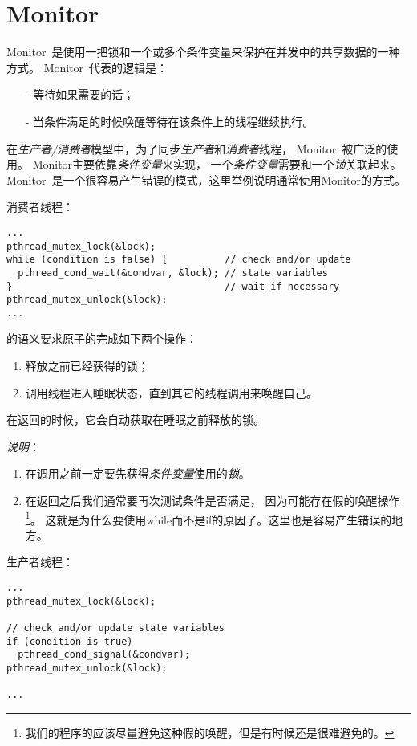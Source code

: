 \section{Monitor}
Monitor~是使用一把锁和一个或多个条件变量来保护在并发中的共享数据的一种方式。
Monitor~代表的逻辑是：
\begin{itemize}
\item[-] 等待如果需要的话；
\item[-] 当条件满足的时候唤醒等待在该条件上的线程继续执行。
\end{itemize}

在\emph{生产者/消费者}模型中，为了同步\emph{生产者}和\emph{消费者}线程，
Monitor~被广泛的使用。 
Monitor主要依靠\emph{条件变量}来实现，
一个\emph{条件变量}需要和一个\emph{锁}关联起来。
Monitor~是一个很容易产生错误的模式，这里举例说明通常使用Monitor的方式。

消费者线程：
\begin{lstlisting}
...
pthread_mutex_lock(&lock);
while (condition is false) {          // check and/or update 
  pthread_cond_wait(&condvar, &lock); // state variables
}                                     // wait if necessary
pthread_mutex_unlock(&lock);
...
\end{lstlisting}
的语义要求原子的完成如下两个操作：
\begin{enumerate}
\item 释放之前已经获得的锁；
\item 调用线程进入睡眠状态，直到其它的线程调用来唤醒自己。
\end{enumerate}
在返回的时候，它会自动获取在睡眠之前释放的锁。

\emph{说明}：
\begin{enumerate}
\item 在调用之前一定要先获得\emph{条件变量}使用的\emph{锁}。
\item 在返回之后我们通常要再次测试条件是否满足，
因为可能存在假的唤醒操作\footnote{我们的程序的应该尽量避免这种假的唤醒，但是有时候还是很难避免的。}。
这就是为什么要使用while而不是if的原因了。这里也是容易产生错误的地方。
\end{enumerate}

生产者线程：
\begin{lstlisting}
...
pthread_mutex_lock(&lock);

// check and/or update state variables
if (condition is true)
  pthread_cond_signal(&condvar);
pthread_mutex_unlock(&lock);

...
\end{lstlisting}


